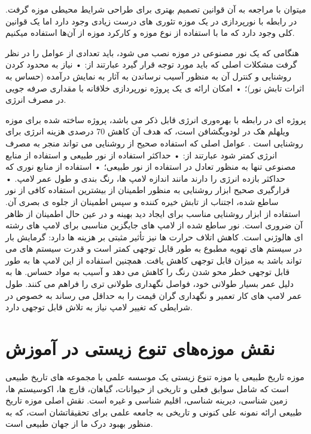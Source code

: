 میتوان با مراجعه به آن قوانین تصمیم بهتری برای طراحی شرایط محیطی موزه گرفت.
در رابطه با نورپردازی در یک موزه تئوری های درست زیادی وجود دارد اما یک قوانین کلی وجود دارد که ما با استفاده از نوع موزه‌ و کارکرد موزه از آن‌ها استفاده میکنیم.


هنگامی که یک نور مصنوعی در موزه نصب می شود، باید تعدادی از عوامل را در نظر گرفت  مشکلات اصلی که باید مورد توجه قرار گیرد عبارتند از:
 • نیاز به محدود کردن روشنایی و کنترل آن به منظور آسیب نرساندن به آثار به نمایش درآمده (حساس به اثرات تابش نور)؛
• امکان ارائه ی یک پروژه نورپردازی خلاقانه با مقداری صرفه جویی در مصرف انرژی.

پروژه ای در رابطه با بهره‌وری انرژی قابل ذکر می باشد، پروژه ساخته شده 
 برای موزه ویلهلم هک در لودویگشافن است، که هدف آن کاهش 70 درصدی هزینه انرژی برای روشنایی‌ است .
عوامل اصلی که استفاده صحیح از روشنایی می تواند منجر به مصرف انرژی کمتر شود عبارتند از:
 • حداکثر استفاده از نور طبیعی و استفاده از منابع مصنوعی تنها به منظور تعادل در استفاده از نور طبیعی؛ 
• استفاده از منابع نوری که حداکثر بازده انرژی را دارند مانند اندازه لامپ ها، رنگ بندی و طول عمر لامپ. 
• قرارگیری صحیح ابزار روشنایی به منظور اطمینان از بیشترین استفاده کافی از نور ساطع شده، اجتناب از تابش خیره کننده و سپس اطمینان از جلوه ی بصری آن.
استفاده از ابزار روشنایی مناسب برای ایجاد دید بهینه و در عین حال اطمینان از ظاهر آن ضروری است. نور ساطع شده از لامپ های  جایگزین مناسبی برای لامپ های رشته ای هالوژنی است. کاهش اتلاف حرارت  ها نیز تأثیر مثبتی بر هزینه ها دارد: گرمایش بار در سیستم های تهویه مطبوع به طور قابل توجهی کمتر است و قدرت سیستم های  می تواند باشد به میزان قابل توجهی کاهش یافت. همچنین استفاده از این لامپ ها به طور قابل توجهی خطر محو شدن رنگ را کاهش می دهد و آسیب به مواد حساس.  ها به دلیل عمر بسیار طولانی خود، فواصل نگهداری طولانی تری را فراهم می کنند. طول عمر لامپ های  کار تعمیر و نگهداری گران قیمت را به حداقل می رساند  به خصوص در شرایطی که تغییر لامپ نیاز به تلاش قابل توجهی دارد.


\section{نقش موزه‌‌های تنوع زیستی در آموزش}
موزه تاریخ طبیعی یا موزه تنوع زیستی یک موسسه علمی با مجموعه های تاریخ طبیعی است که شامل سوابق فعلی و تاریخی از حیوانات، گیاهان، قارچ ها، اکوسیستم ها، زمین شناسی، دیرینه شناسی، اقلیم شناسی و غیره است.
نقش اصلی موزه تاریخ طبیعی ارائه نمونه علی کنونی و تاریخی به جامعه علمی برای تحقیقاتشان است، که به منظور بهبود درک ما از جهان طبیعی است.

